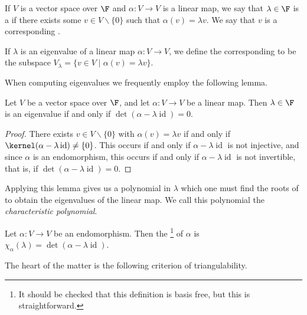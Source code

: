 \begin{definition}
    If $V $ is a vector space over $\F$ and $\alpha: V \rightarrow V$ is a linear map, we say that $\lambda \in \F$ is a  if there exists some $v \in V \backslash\{0\}$ such that $\alpha(v) = \lambda v$. We say that $v$ is a corresponding .
\end{definition}

\begin{definition}[Eigenspace]
    If $\lambda$ is an eigenvalue of a linear map $\alpha: V \rightarrow V$, we define the corresponding  to be the subspace $V_\lambda = \{v \in V \mid \alpha(v) = \lambda v\}$.
\end{definition}

When computing eigenvalues we frequently employ the following lemma.

\begin{lemma}
    Let $V$ be a vector space over $\F$, and
    let $\alpha: V \rightarrow V$ be a linear map. Then $\lambda \in \F$ is an eigenvalue if and only if $\det(\alpha - \lambda \operatorname{id}) = 0$.
\end{lemma}
\begin{proof}
    There exists $v \in V \backslash\{0\}$ with $\alpha(v) = \lambda v$ if and only if $\kernel (\alpha - \lambda \operatorname{id}) \neq \{0\}$. This occurs if and only if $\alpha - \lambda \operatorname{id}$ is not injective, and since $\alpha$ is an endomorphism, this occurs if and only if $\alpha - \lambda \operatorname{id}$ is not invertible, that is, if $\det(\alpha - \lambda \operatorname{id}) = 0$.
\end{proof}

Applying this lemma gives us a polynomial in $\lambda$ which one must find the roots of to obtain the eigenvalues of the linear map. We call this polynomial the \emph{characteristic polynomial}.

\begin{definition}
    Let $\alpha: V \rightarrow V$ be an endomorphism. Then the \footnote{It should be checked that this definition is basis free, but this is straightforward.} of $\alpha$ is $\chi_{\alpha}(\lambda) = \det(\alpha - \lambda \operatorname{id})$.
\end{definition}

The heart of the matter is the following criterion of triangulability.

